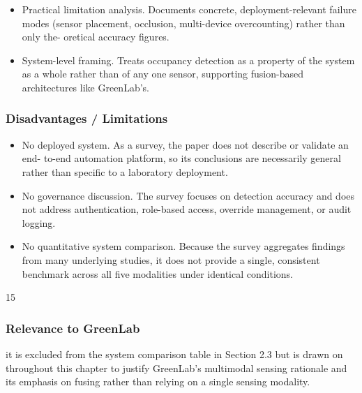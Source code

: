 \begin{itemize}
  \item Practical limitation analysis. Documents concrete, deployment-relevant failure
modes (sensor placement, occlusion, multi-device overcounting) rather than only the-
oretical accuracy ﬁgures.
\end{itemize}


\begin{itemize}
  \item System-level framing. Treats occupancy detection as a property of the system as
a whole rather than of any one sensor, supporting fusion-based architectures like
GreenLab's.
\end{itemize}




\subsubsection*{Disadvantages / Limitations}



\begin{itemize}
  \item No deployed system. As a survey, the paper does not describe or validate an end-
to-end automation platform, so its conclusions are necessarily general rather than
speciﬁc to a laboratory deployment.
\end{itemize}


\begin{itemize}
  \item No governance discussion. The survey focuses on detection accuracy and does not
address authentication, role-based access, override management, or audit logging.
\end{itemize}


\begin{itemize}
  \item No quantitative system comparison. Because the survey aggregates ﬁndings from
many underlying studies, it does not provide a single, consistent benchmark across
all ﬁve modalities under identical conditions.
\end{itemize}

15



\subsubsection*{Relevance to GreenLab}

it is excluded from the system comparison table in Section 2.3 but is drawn on throughout
this chapter to justify GreenLab's multimodal sensing rationale and its emphasis on fusing
rather than relying on a single sensing modality.






